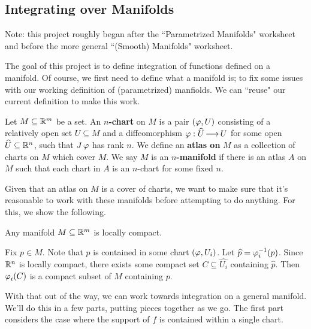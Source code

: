 \subsection{Integrating over Manifolds}
Note: this project roughly began after the ``Parametrized Manifolds" worksheet
and before the more general ``(Smooth) Manifolds" worksheet.

The goal of this project is to define integration of functions defined on a
manifold. Of course, we first need to define what a manifold is; to fix some
issues with our working definition of (parametrized) manfiolds. We can ``reuse"
our current definition to make this work.

\begin{defn}
    Let $ M \subseteq \mathbb{R}^{m} $ be a set. An $ n $\textbf{-chart} on $ M $ is a
    pair $ (\operatorname{\varphi}, U) $ consisting of a relatively open set $ U \subseteq M $ and
    a diffeomorphism $ \operatorname{\varphi}: \widehat{U} \operatorname{\longrightarrow} U $ for some open $ \widehat{U}
    \subseteq \mathbb{R}^{n} $, such that $ J\operatorname{\varphi} $ has rank $ n $. \vsp
    We define an \textbf{atlas on} $ M $ as a collection of charts on $ M $ which
    cover $ M $. \vsp
    We say $ M $ is an $ n $\textbf{-manifold} if there is an atlas $ A $ on
    $ M $ such that each chart in $ A $ is an $ n $-chart for some fixed $ n $.
\end{defn}

Given that an atlas on $ M $ is a cover of charts, we want to make sure that it's
reasonable to work with these manifolds before attempting to do anything. For
this, we show the following.
\vspace{-0.2in}
\begin{lm}
    Any manifold $ M \subseteq \mathbb{R}^{m} $ is locally compact.
\end{lm}
\vspace{-0.2in}
\begin{pf}
    Fix $ p \in M $. Note that $ p $ is contained in some chart
    $ (\operatorname{\varphi}, U_{i}) $. Let $ \widehat{p} = \operatorname{\varphi}_{i}^{-1}(p) $. Since $ \mathbb{R}^{n} $ is
    locally compact, there exists some compact set $ C \subseteq \hat{U_{i}} $
    containing $ \hat{p} $. Then $ \operatorname{\varphi}_{i}(C) $ is a compact subset of $ M $
    containing $ p $.
\end{pf}

With that out of the way, we can work towards integration on a general manifold.
We'll do this in a few parts, putting pieces together as we go. The first part
considers the case where the support of $ f $ is contained within a single chart.

